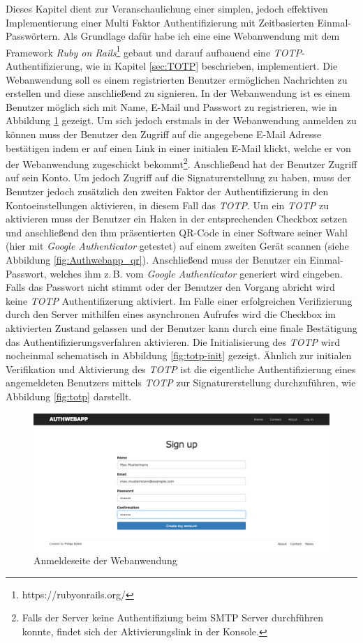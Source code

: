 \documentclass[11pt,a4paper,ngerman]{scrreprt}
\begin{document}
Dieses Kapitel dient zur Veranschaulichung einer simplen, jedoch effektiven Implementierung einer Multi Faktor Authentifizierung mit Zeitbasierten Einmal-Passwörtern. Als Grundlage dafür habe ich eine eine Webanwendung mit dem Framework \textit{Ruby on Rails}\footnote{https://rubyonrails.org/} gebaut und darauf aufbauend eine \textit{TOTP}-Authentifizierung, wie in Kapitel \ref{sec:TOTP} beschrieben, implementiert. Die Webanwendung soll es einem registrierten Benutzer ermöglichen Nachrichten zu erstellen und diese anschließend zu signieren. In der Webanwendung ist es einem Benutzer möglich sich mit Name, E-Mail und Passwort zu registrieren, wie in Abbildung \ref{fig:Authwebapp_login} gezeigt. Um sich jedoch erstmals in der Webanwendung anmelden zu können muss der Benutzer den Zugriff auf die angegebene E-Mail Adresse bestätigen indem er auf einen Link in einer initialen E-Mail klickt, welche er von der Webanwendung zugeschickt bekommt\footnote{Falls der Server keine Authentifiziung beim SMTP Server durchführen konnte, findet sich der Aktivierungslink in der Konsole.}. Anschließend hat der Benutzer Zugriff auf sein Konto. Um jedoch Zugriff auf die Signaturerstellung zu haben, muss der Benutzer jedoch zusätzlich den zweiten Faktor der Authentifizierung in den Kontoeinstellungen aktivieren, in diesem Fall das \textit{TOTP}. Um ein \textit{TOTP} zu aktivieren muss der Benutzer ein Haken in der entsprechenden Checkbox setzen und anschließend den ihm präsentierten QR-Code in einer Software seiner Wahl (hier mit \textit{Google Authenticator} getestet) auf einem zweiten Gerät scannen (siehe Abbildung \ref{fig:Authwebapp_qr}). Anschließend muss der Benutzer ein Einmal-Passwort, welches ihm z.\,B. vom \textit{Google Authenticator} generiert wird eingeben. Falls das Passwort nicht stimmt oder der Benutzer den Vorgang abricht wird keine \textit{TOTP} Authentifizerung aktiviert. Im Falle einer erfolgreichen Verifizierung durch den Server mithilfen eines asynchronen Aufrufes wird die Checkbox im aktivierten Zustand gelassen und der Benutzer kann durch eine finale Bestätigung das Authentifizierungsverfahren aktivieren. Die Initialisierung des \textit{TOTP} wird nocheinmal schematisch in Abbildung \ref{fig:totp-init} gezeigt. Ähnlich zur initialen Verifikation und Aktivierung des \textit{TOTP} ist die eigentliche Authentifizierung eines angemeldeten Benutzers mittels \textit{TOTP} zur Signaturerstellung durchzuführen, wie Abbildung \ref{fig:totp} darstellt.
\begin{figure}[htbp]
    \centering
        \includegraphics[width=\textwidth]{Abbildungen/Authwebapp_login}
    \caption{Anmeldeseite der Webanwendung}
    \label{fig:Authwebapp_login}
\end{figure}
\end{document}
